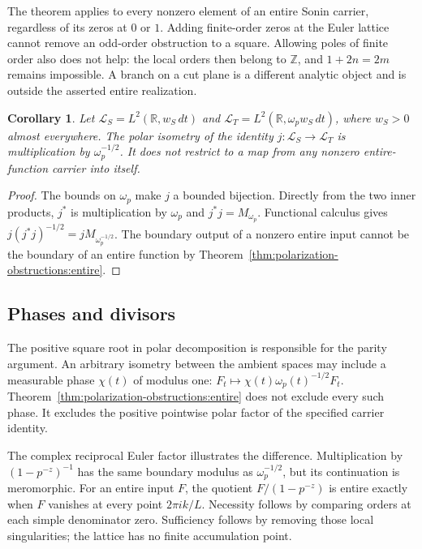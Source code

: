 \documentclass[11pt,letterpaper]{article}
\newtheorem{corollary}[theorem]{Corollary}
\theoremstyle{definition}
\theoremstyle{remark}
\newcommand{\R}{\mathbb R}
\newcommand{\Z}{\mathbb Z}
\begin{document}
The theorem applies to every nonzero element of an entire Sonin
carrier, regardless of its zeros at $0$ or $1$. Adding finite-order
zeros at the Euler lattice cannot remove an odd-order obstruction
to a square. Allowing poles of finite order also does not help:
the local orders then belong to $\Z$, and $1+2n=2m$ remains
impossible. A branch on a cut plane is a different analytic object
and is outside the asserted entire realization.

\begin{corollary}
\label{cor:ambient-polar}
Let $\mathcal L_S=L^2(\R,w_S\,dt)$ and
$\mathcal L_T=L^2(\R,\omega_p w_S\,dt)$, where $w_S>0$ almost everywhere.
The polar isometry of the identity $j:\mathcal L_S\to\mathcal L_T$
is multiplication by $\omega_p^{-1/2}$. It does not restrict to a map
from any nonzero entire-function carrier into itself.
\end{corollary}
\begin{proof}
The bounds on $\omega_p$ make $j$ a bounded bijection. Directly from
the two inner products, $j^*$ is multiplication by $\omega_p$ and
$j^*j=M_{\omega_p}$. Functional calculus gives
$j(j^*j)^{-1/2}=jM_{\omega_p^{-1/2}}$. The boundary output of a
nonzero entire input cannot be the boundary of an entire function
by Theorem~\ref{thm:polarization-obstructions:entire}.
\end{proof}

\subsection{Phases and divisors}

The positive square root in polar decomposition is responsible
for the parity argument. An arbitrary isometry between the ambient
spaces may include a measurable phase $\chi(t)$ of modulus one:
$F_t\mapsto\chi(t)\omega_p(t)^{-1/2}F_t$.
Theorem~\ref{thm:polarization-obstructions:entire} does not exclude
every such phase. It excludes the positive pointwise polar factor
of the specified carrier identity.

The complex reciprocal Euler factor illustrates the difference.
Multiplication by $(1-p^{-z})^{-1}$ has the same boundary modulus
as $\omega_p^{-1/2}$, but its continuation is meromorphic. For an entire
input $F$, the quotient $F/(1-p^{-z})$ is entire exactly when $F$
vanishes at every point $2\pi ik/L$. Necessity follows by comparing
orders at each simple denominator zero. Sufficiency follows by
removing those local singularities; the lattice has no finite
accumulation point.
\end{document}
